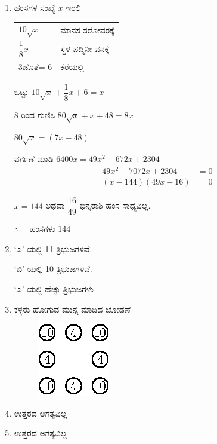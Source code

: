 \begin{enumerate}
\item ಹಂಸಗಳ ಸಂಖ್ಯೆ $x$ ಇರಲಿ 

\begin{tabular}[t]{ll}
$10 \sqrt{x}$ & ಮಾನಸ ಸರೋವರಕ್ಕೆ \\
$\dfrac{1}{8} x$ & ಸ್ಥಳ ಪದ್ಮಿನೀ ವನಕ್ಕೆ \\
$3$ಜೊತೆ= $6$ & ಕೆರೆಯಲ್ಲಿ\\
\end{tabular}

ಒಟ್ಟು $10\sqrt{x} + \dfrac{1}{8}x + 6 = x$

8 ರಿಂದ ಗುಣಿಸಿ $80\sqrt{x} + x + 48 = 8x$

$80\sqrt{x} = (7x - 48)$

ವರ್ಗಣೆ ಮಾಡಿ $6400x = 49x^{2} - 672x + 2304$
\begin{align*}
49x^{2} - 7072x + 2304 & = 0\\
(x - 144) (49x - 16) & = 0
\end{align*}
 
 $x = 144$ ಅಥವಾ $\dfrac{16}{49}$ ಭಿನ್ನರಾಶಿ ಹಂಸ ಸಾಧ್ಯವಿಲ್ಲ. 
 
 $\therefore\quad$ ಹಂಸಗಳು 144

\item `ಎ' ಯಲ್ಲಿ 11 ತ್ರಿಭುಜಗಳಿವೆ. 

`ಬಿ' ಯಲ್ಲಿ 10 ತ್ರಿಭುಜಗಳಿವೆ. 

`ಎ' ಯಲ್ಲಿ ಹೆಚ್ಚು ತ್ರಿಭುಜಗಳು 

\item ಕಳ್ಳರು ಹೋಗುವ ಮುನ್ನ ಮಾಡಿದ ಜೋಡಣೆ 
\begin{figure}[H]
\centering
\includegraphics{images/chap12/ans28.eps}

\hspace{1.5cm}
\end{figure} 

\item ಉತ್ತರದ ಅಗತ್ಯವಿಲ್ಲ 

\item ಉತ್ತರದ ಅಗತ್ಯವಿಲ್ಲ 
\end{enumerate}
